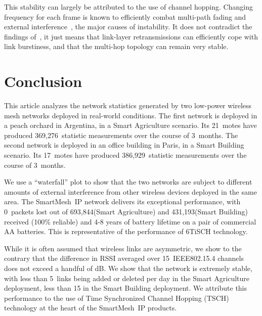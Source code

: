 \documentclass{elsarticle}
\newcommand{\smip}                {SmartMesh~IP\xspace}
\newcommand{\building}            {Smart Building\xspace}
\newcommand{\agri}                {Smart Agriculture\xspace}
\newcommand{\PEACHNUMSTATS}       {369,276\xspace}
\newcommand{\PEACHNUMPCKTS}       {693,844\xspace}
\newcommand{\EVANUMSTATS}         {386,929\xspace}
\newcommand{\EVANUMPCKTS}         {431,193\xspace}
\begin{document}

This stability can largely be attributed to the use of channel hopping.
Changing frequency for each frame is known to efficiently combat multi-path fading and external interference~\cite{watteyne09reliability}, the major causes of instability.
It does not contradict the findings of~\cite{srinivasan08beta}, it just means that link-layer retransmissions can efficiently cope with link burstiness, and that the multi-hop topology can remain very stable.

\section{Conclusion}
\label{sec:conclusion}


This article analyzes the network statistics generated by two low-power wireless mesh networks deployed in real-world conditions.
The first network is deployed in a peach orchard in Argentina, in a \agri scenario.
Its 21~motes have produced \PEACHNUMSTATS~statistic measurements over the course of 3~months.
The second network is deployed in an office building in Paris, in a \building scenario.
Its 17~motes have produced \EVANUMSTATS~statistic measurements over the course of 3~months.


We use a ``waterfall'' plot to show that the two networks are subject to different amounts of external interference from other wireless devices deployed in the same area.
The \smip network delivers its exceptional performance, with 0~packets lost out of \PEACHNUMPCKTS (\agri) and \EVANUMPCKTS (\building) received (100\% reliable) and 4-8 years of battery lifetime on a pair of commercial AA batteries.
This is representative of the performance of 6TiSCH technology.


While it is often assumed that wireless links are asymmetric, we show to the contrary that the difference in RSSI averaged over 15~IEEE802.15.4 channels does not exceed a handful of dB.
We show that the network is extremely stable, with less than 5~links being added or deleted per day in the \agri deployment, less than 15 in the \building deployment.
We attribute this performance to the use of Time Synchronized Channel Hopping (TSCH) technology at the heart of the \smip products.

\end{document}
